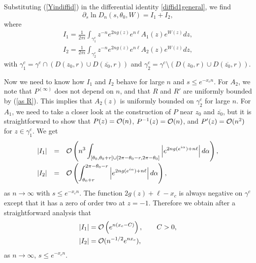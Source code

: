 \documentclass[11pt,fleqn]{article}
\numberwithin{equation}{section}
\def\bigO{{\cal O}}
\begin{document}
 Substituting (\ref{Yindiffid}) in the differential identity \eqref{diffid1general}, we find 
\begin{equation} \label{diff_identity_W}
\partial_{s} \ln D_{n} (s,\theta_{0},W) = I_{1} + I_{2},
\end{equation}
where
\begin{equation*}
\begin{array}{l}
\displaystyle I_{1} = \frac{1}{2\pi i} \int_{\gamma_{1}^{c}} z^{-n} e^{2ng(z)}e^{n\ell} A_{1}(z) e^{W(z)}dz, \\[0.4cm]
\displaystyle I_{2} = \frac{1}{2\pi i} \int_{\gamma_{2}^{c}} z^{-n} e^{2ng(z)} e^{n\ell} A_{2}(z) e^{W(z)}dz, 
\end{array}
\end{equation*}
with $\gamma_{1}^{c} = \gamma^{c} \cap (D(z_{0},r) \cup D(\overline{z_{0}},r))$ and $\gamma_{2}^{c} = \gamma^{c}\setminus (D(z_{0},r) \cup D(\overline{z_{0}},r))$.

Now we need to know how $I_1$ and $I_2$ behave for large $n$ and $s\leq e^{-x_cn}$. For $A_2$, we note that $P^{(\infty)}$ does not depend on $n$, and that $R$ and $R'$ are uniformly bounded by (\ref{as R}). This implies that $A_{2}(z)$ is uniformly bounded on $\gamma_2^c$ for large $n$. For $A_1$, we need to take a closer look at the construction of $P$ near $z_0$ and $\overline{z_0}$, but it is straightforward to show that $P(z)=\bigO(n)$, $P^{-1}(z)=\bigO(n)$, and $P'(z)=\bigO(n^2)$ for $z\in\gamma_1^c$.
We get
\begin{equation*}
\begin{array}{r c l}
\displaystyle |I_{1}| & = & \displaystyle \bigO \left(n^3 \int_{[\theta_{0},\theta_{0}+r] \cup [2\pi - \theta_{0}-r,2\pi - \theta_{0}]} \left| e^{2ng(e^{i\alpha})+n\ell} \right| d\alpha \right), \\[0.4cm]
\displaystyle |I_{2}| & = & \displaystyle \bigO \left( \int_{\theta_{0}+r}^{2\pi -\theta_{0}-r} \left| e^{2ng(e^{i\alpha})+n\ell} \right| d\alpha \right),
\end{array}
\end{equation*}
as $n\to\infty$ with $s\leq e^{-x_c n}$.
The function $2g(z)+\ell-x_{c}$ is always negative on $\gamma^{c}$ except that it has a zero of order two at $z=-1$. 
Therefore we obtain after a straightforward analysis that
\begin{align}
&|I_{1}| = \bigO\left(e^{n(x_{c}-C)} \right),\qquad C>0, \label{Estimate1}\\
&|I_{2}| = \bigO (n^{-1/2}e^{nx_{c}}), \label{Estimate2}
\end{align}
as $n\to\infty$, $s\leq e^{-x_c n}$.
\end{document}

